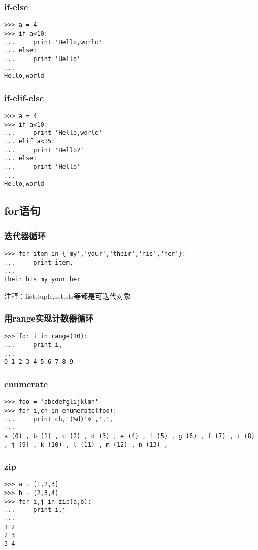 \documentclass[13pt]{beamer}
\begin{document}
\begin{frame}[containsverbatim]
\frametitle{if-else}
\begin{lstlisting}
>>> a = 4
>>> if a<10:
...     print 'Hello,world'
... else:
...     print 'Hello'
...
Hello,world
\end{lstlisting}
\end{frame}

\begin{frame}[containsverbatim]
\frametitle{if-elif-else}
\begin{lstlisting}
>>> a = 4
>>> if a<10:
...     print 'Hello,world'
... elif a<15:
...     print 'Hello?'
... else:
...     print 'Hello'
...
Hello,world
\end{lstlisting}
\end{frame}


\subsection{for语句}
\begin{frame}[containsverbatim]
\frametitle{迭代器循环}
\begin{lstlisting}
>>> for item in {'my','your','their','his','her'}:
...     print item,
...
their his my your her
\end{lstlisting}
注释：list,tuple,set,str等都是可迭代对象
\end{frame}

\begin{frame}[containsverbatim]
\frametitle{用range实现计数器循环}
\begin{lstlisting}
>>> for i in range(10):
...     print i,
...
0 1 2 3 4 5 6 7 8 9
\end{lstlisting}
\end{frame}

\begin{frame}[containsverbatim]
\frametitle{enumerate}
\begin{lstlisting}
>>> foo = 'abcdefglijklmn'
>>> for i,ch in enumerate(foo):
...     print ch,'(%d)'%i,',',
...
a (0) , b (1) , c (2) , d (3) , e (4) , f (5) , g (6) , l (7) , i (8) , j (9) , k (10) , l (11) , m (12) , n (13) ,
\end{lstlisting}
\end{frame}

\begin{frame}[containsverbatim]
\frametitle{zip}
\begin{lstlisting}
>>> a = [1,2,3]
>>> b = (2,3,4)
>>> for i,j in zip(a,b):
...     print i,j
...
1 2
2 3
3 4
\end{lstlisting}
\end{frame}
\end{document}
